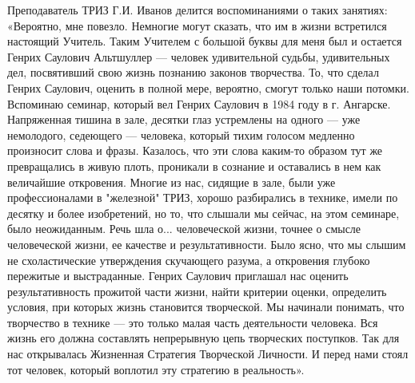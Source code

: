 Преподаватель  ТРИЗ   Г.И.  Иванов  делится  воспоминаниями   о  таких
занятиях: «Вероятно,  мне повезло.  Немногие могут  сказать, что  им в
жизни встретился настоящий Учитель. Таким Учителем с большой буквы для
меня был и остается Генрих  Саулович Альтшуллер — человек удивительной
судьбы,  удивительных дел,  посвятивший  свою  жизнь познанию  законов
творчества. То,  что сделал  Генрих Саулович,  оценить в  полной мере,
вероятно, смогут  только наши потомки. Вспоминаю  семинар, который вел
Генрих Саулович в 1984 году в  г. Ангарске. Напряженная тишина в зале,
десятки  глаз  устремлены на  одного  —  уже немолодого,  седеющего  —
человека,  который тихим  голосом медленно  произносит слова  и фразы.
Казалось, что эти  слова каким-то образом тут же  превращались в живую
плоть,  проникали  в  сознание  и  оставались  в  нем  как  величайшие
откровения. Многие из нас, сидящие  в зале, были уже профессионалами в
"железной"  ТРИЗ, хорошо  разбирались в  технике, имели  по десятку  и
более изобретений,  но то,  что слышали мы  сейчас, на  этом семинаре,
было неожиданным.  Речь шла о...  человеческой жизни, точнее  о смысле
человеческой жизни, ее качестве и  результативности. Было ясно, что мы
слышим не  схоластические утверждения скучающего разума,  а откровения
глубоко  пережитые  и  выстраданные.  Генрих  Саулович  приглашал  нас
оценить результативность прожитой части  жизни, найти критерии оценки,
определить  условия,  при  которых  жизнь  становится  творческой.  Мы
начинали понимать, что  творчество в технике — это  только малая часть
деятельности  человека. Вся  жизнь его  должна составлять  непрерывную
цепь творческих поступков. Так для нас открывалась Жизненная Стратегия
Творческой Личности. И перед нами  стоял тот человек, который воплотил
эту стратегию в реальность».
